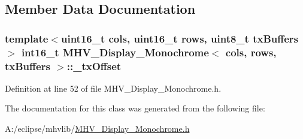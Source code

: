 \subsection{Member Data Documentation}
\hypertarget{class_m_h_v___display___monochrome_a4abea2d9c872bf4ef8dda9cd752fd387}{
\subsubsection[{\-\_\-tx\-Offset}]{\setlength{\rightskip}{0pt plus 5cm}template$<$uint16\-\_\-t cols, uint16\-\_\-t rows, uint8\-\_\-t tx\-Buffers$>$ int16\-\_\-t {\bf M\-H\-V\-\_\-\-Display\-\_\-\-Monochrome}$<$ cols, rows, tx\-Buffers $>$\-::\-\_\-tx\-Offset\hspace{0.3cm}{\ttfamily [protected]}}}\label{class_m_h_v___display___monochrome_a4abea2d9c872bf4ef8dda9cd752fd387}


Definition at line 52 of file M\-H\-V\-\_\-\-Display\-\_\-\-Monochrome.\-h.



The documentation for this class was generated from the following file\-:\begin{DoxyCompactItemize}
\item 
A\-:/eclipse/mhvlib/\hyperlink{_m_h_v___display___monochrome_8h}{M\-H\-V\-\_\-\-Display\-\_\-\-Monochrome.\-h}\end{DoxyCompactItemize}
